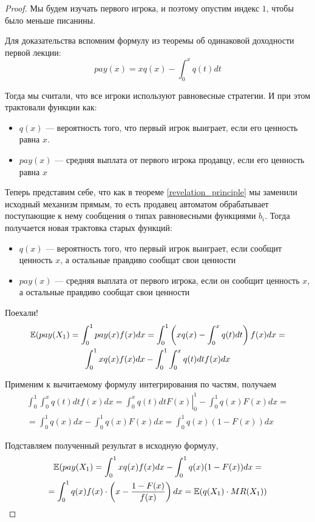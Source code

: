 \begin{proof}
Мы будем изучать первого игрока, и поэтому опустим индекс $ 1 $, чтобы было меньше писанины.

Для доказательства вспомним формулу из теоремы об одинаковой доходности первой лекции:
\begin{equation}
pay(x)=xq(x)-\int_{0}^{x}q(t)dt
\end{equation}

Тогда мы считали, что все игроки используют равновесные стратегии. И при этом трактовали функции как:

\begin{itemize}
\item $ q(x) $ — вероятность того, что первый игрок выиграет, если его ценность равна $ x $.
\item $ pay(x) $ — средняя выплата от первого игрока продавцу, если его ценность равна $ x $
\end{itemize}

Теперь представим себе, что как в теореме \ref{revelation_principle} мы заменили исходный механизм прямым, то есть продавец автоматом обрабатывает поступающие к нему сообщения о типах равновесными функциями $ b_{i} $. Тогда получается новая трактовка старых функций:

\begin{itemize}
\item $ q(x) $ — вероятность того, что первый игрок выиграет, если сообщит ценность $ x $, а остальные правдиво сообщат свои ценности
\item $ pay(x) $ — средняя выплата от первого игрока, если он сообщит ценность $x$, а остальные правдиво сообщат свои ценности
\end{itemize}

Поехали!
\begin{multline}
\operatorname{\mathbb{E}}(pay(X_{1})=\int_{0}^{1} pay(x)f(x)dx=\int_{0}^{1} \left( xq(x)-\int_{0}^{x}q(t)dt \right) f(x) dx=\\
\int_{0}^{1}xq(x)f(x)dx-\int_{0}^{1}\int_{0}^{x}q(t)dt f(x)dx
\end{multline}

Применим к вычитаемому формулу интегрирования по частям, получаем
\begin{multline}
\int_{0}^{1}\int_{0}^{x}q(t)dt f(x)dx=\left. \int_{0}^{x}q(t)dt F(x)\right|_{0}^{1}-\int_{0}^{1}q(x)F(x)dx=\\
=\int_{0}^{1} q(x)dx-\int_{0}^{1}q(x)F(x)dx=\int_{0}^{1} q(x)(1-F(x))dx
\end{multline}

Подставляем полученный результат в исходную формулу,
\begin{multline}
\operatorname{\mathbb{E}}(pay(X_{1})=\int_{0}^{1}xq(x)f(x)dx-\int_{0}^{1} q(x)(1-F(x))dx=\\
=\int_{0}^{1}q(x)f(x)\cdot \left(x-\frac{1-F(x)}{f(x)} \right)dx=\operatorname{\mathbb{E}}(q(X_{1})\cdot MR(X_{1}))
\end{multline}
\end{proof}

